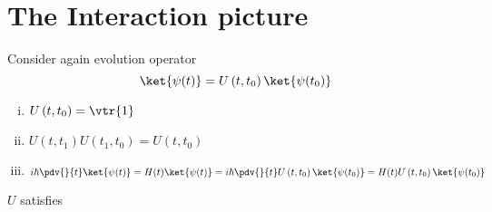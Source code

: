 \section{The Interaction picture}
Consider again evolution operator
\begin{dmath}[]
	\ket{\psi(t)}=U\left( t,t_0 \right)\ket{\psi(t_0)}
\end{dmath}
\begin{enumerate}[i)]
	\item $U\left( t,t_0 \right)=\vtr{1}$
	\item $U\left( t,t_1 \right)U\left( t_1,t_0 \right)=U\left( t,t_0 \right)$
	\item 
		\begin{dmath}[]
			i\hbar \pdv{}{t}\ket{\psi(t)}=H(t)\ket{\psi(t)}
			=i\hbar \pdv{}{t}U\left( t,t_0 \right)\ket{\psi(t_0)}
			=H(t)U\left( t,t_0 \right)\ket{\psi(t_0)}
		\end{dmath}
\end{enumerate}
		$U$ satisfies
